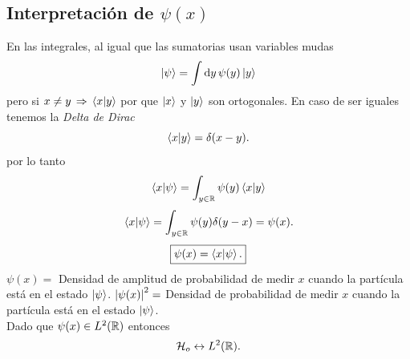 \subsection{Interpretación de $\psi (x)$}
En las integrales, al igual que las sumatorias usan variables mudas
    $$ \ket{\psi} = \int \dd{y} \psi (y) \ket{y} $$
pero si $x\neq y \, \Rightarrow \, \braket{x}{y}$ por que $\ket{x}$ y $\ket{y}$ son ortogonales. En caso de ser iguales tenemos la \textit{Delta de Dirac}
    $$ \braket{x}{y} = \delta (x - y). $$
por lo tanto
    $$ \braket{x}{\psi} = \int _{y\in \mathbb{R}} \psi (y) \braket{x}{y} $$
    $$ \braket{x}{\psi} = \int _{y\in \mathbb{R}} \psi (y) \delta (y - x) = \psi (x). $$
    $$ \boxed{ \psi (x) = \braket{x}{\psi}. } $$
$\psi (x) = $ Densidad de amplitud de probabilidad de medir $x$ cuando la partícula está en el estado $\ket{\psi}$. $\abs{\psi (x)}^2 = $ Densidad de probabilidad de medir $x$ cuando la partícula está en el estado $\ket{\psi}$. \\

Dado que $\psi (x) \in L^2 (\mathbb{R})$ entonces
    $$ \mathcal{H} _o \leftrightarrow L^2 (\mathbb{R}). $$

